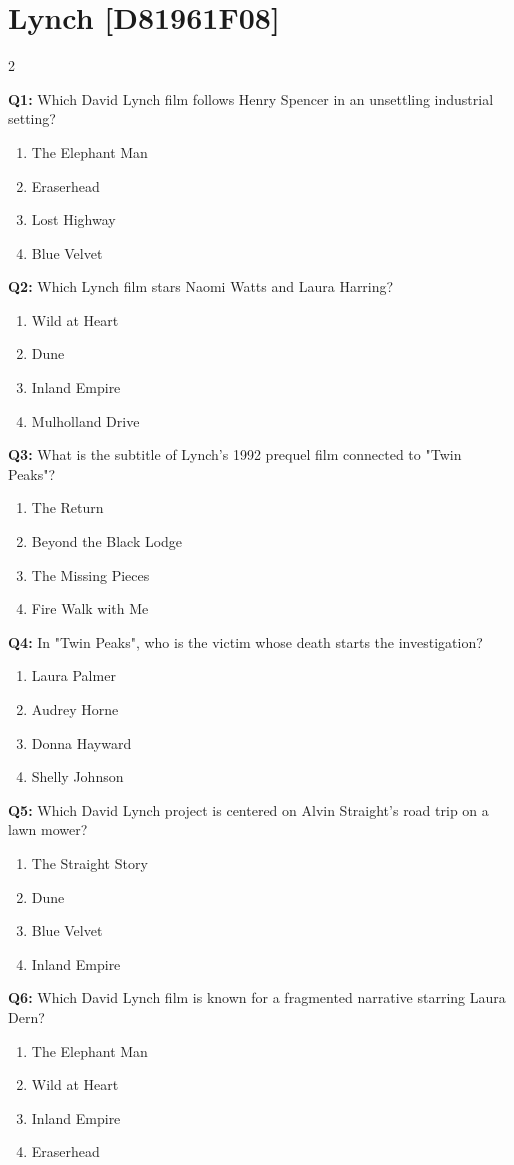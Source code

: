 \documentclass[10pt]{article}
\begin{document}
\section*{Lynch \footnotesize [D81961F08]}
\begin{multicols}{2}

\textbf{Q1:} Which David Lynch film follows Henry Spencer in an unsettling industrial setting?

\begin{enumerate}[label=\arabic*.]
\item The Elephant Man
\item Eraserhead
\item Lost Highway
\item Blue Velvet
\end{enumerate}
\textbf{Q2:} Which Lynch film stars Naomi Watts and Laura Harring?

\begin{enumerate}[label=\arabic*.]
\item Wild at Heart
\item Dune
\item Inland Empire
\item Mulholland Drive
\end{enumerate}
\textbf{Q3:} What is the subtitle of Lynch's 1992 prequel film connected to "Twin Peaks"?

\begin{enumerate}[label=\arabic*.]
\item The Return
\item Beyond the Black Lodge
\item The Missing Pieces
\item Fire Walk with Me
\end{enumerate}
\textbf{Q4:} In "Twin Peaks", who is the victim whose death starts the investigation?

\begin{enumerate}[label=\arabic*.]
\item Laura Palmer
\item Audrey Horne
\item Donna Hayward
\item Shelly Johnson
\end{enumerate}
\textbf{Q5:} Which David Lynch project is centered on Alvin Straight's road trip on a lawn mower?

\begin{enumerate}[label=\arabic*.]
\item The Straight Story
\item Dune
\item Blue Velvet
\item Inland Empire
\end{enumerate}
\textbf{Q6:} Which David Lynch film is known for a fragmented narrative starring Laura Dern?

\begin{enumerate}[label=\arabic*.]
\item The Elephant Man
\item Wild at Heart
\item Inland Empire
\item Eraserhead
\end{enumerate}
\end{multicols}
\end{document}
